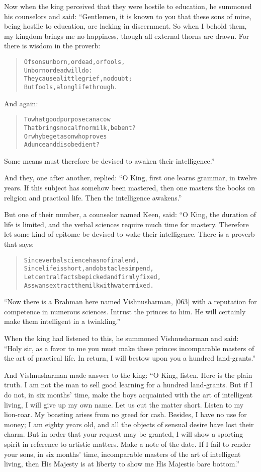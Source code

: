 \documentclass[article, twoside, 14pt]{memoir}
\renewenvironment{verbatim}{%
\begin{quote}%
\vskip -10pt%
\begin{alltt}\normalfont\large}{\end{alltt}%
\end{quote}%
\vskip -10pt
} %
\begin{document}
Now when the king perceived that they were hostile to education, he
summoned his counselors and said: “Gentlemen, it is known to you
that these sons of mine, being hostile to education, are lacking in
discernment. So when I behold them, my kingdom brings me no
happiness, though all external thorns are drawn. For there is
wisdom in the proverb:

\begin{verbatim}
Of sons unborn, or dead, or fools,
    Unborn or dead will do:
They cause a little grief, no doubt;
    But fools, a long life through.
\end{verbatim}
And again:

\begin{verbatim}
To what good purpose can a cow
    That brings no calf nor milk, be bent?
Or why beget a son who proves
    A dunce and disobedient?
\end{verbatim}
Some means must therefore be devised to awaken their
intelligence.”

And they, one after another, replied:
``O King, first one learns grammar, in twelve years. If this subject has somehow been mastered, then one masters the books on religion and practical life. Then the intelligence awakens.''

But one of their number, a counselor named Keen, said: “O King, the
duration of life is limited, and the verbal sciences require much
time for mastery. Therefore let some kind of epitome be devised to
wake their intelligence. There is a proverb that says:

\begin{verbatim}
Since verbal science has no final end,
Since life is short, and obstacles impend,
Let central facts be picked and firmly fixed,
As swans extract the milk with water mixed.
\end{verbatim}
``Now there is a Brahman here named Vishnusharman, [063] with a reputation for competence in numerous sciences. Intrust the princes to him. He will certainly make them intelligent in a twinkling.''

When the king had listened to this, he summoned Vishnusharman and
said:
``Holy sir, as a favor to me you must make these princes incomparable masters of the art of practical life. In return, I will bestow upon you a hundred land-grants.''

And Vishnusharman made answer to the king:
``O King, listen. Here is the plain truth. I am not the man to sell good learning for a hundred land-grants. But if I do not, in six months' time, make the boys acquainted with the art of intelligent living, I will give up my own name. Let us cut the matter short. Listen to my lion-roar. My boasting arises from no greed for cash. Besides, I have no use for money; I am eighty years old, and all the objects of sensual desire have lost their charm. But in order that your request may be granted, I will show a sporting spirit in reference to artistic matters. Make a note of the date. If I fail to render your sons, in six months' time, incomparable masters of the art of intelligent living, then His Majesty is at liberty to show me His Majestic bare bottom.''
\end{document}
